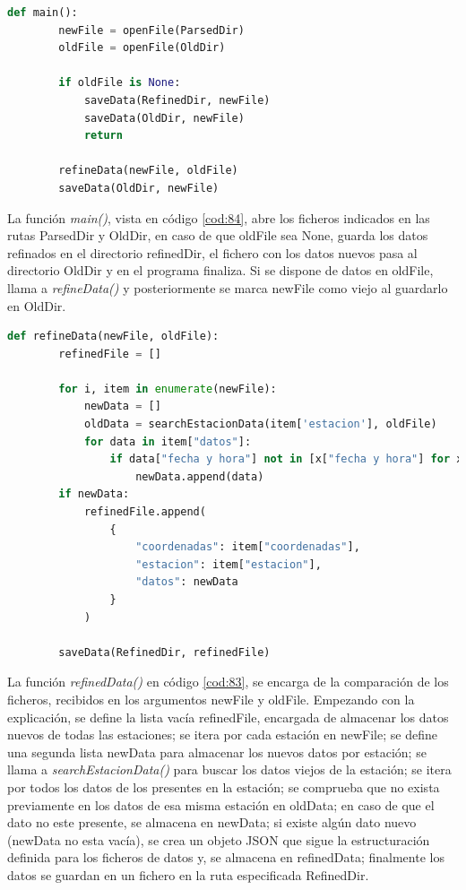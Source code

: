 \begin{lstlisting}[language=Python, caption={Declaración rutas JSONs}, label=cod:84]
	def main():
		newFile = openFile(ParsedDir)
		oldFile = openFile(OldDir)
		
		if oldFile is None:
			saveData(RefinedDir, newFile)
			saveData(OldDir, newFile)
			return
		
		refineData(newFile, oldFile)
		saveData(OldDir, newFile)
\end{lstlisting}

La función \textit{main()}, vista en código \ref{cod:84}, abre los ficheros indicados en las rutas ParsedDir y OldDir, en caso de que oldFile sea None, guarda los datos refinados en el directorio refinedDir, el fichero con los datos nuevos pasa al directorio OldDir y en el programa finaliza. Si se dispone de datos en oldFile, llama a \textit{refineData()} y posteriormente se marca newFile como viejo al guardarlo en OldDir.

\begin{lstlisting}[language=Python, caption={Declaración función refinedData()}, label=cod:83]
	def refineData(newFile, oldFile):
		refinedFile = []
		
		for i, item in enumerate(newFile):
			newData = []
			oldData = searchEstacionData(item['estacion'], oldFile)
			for data in item["datos"]:
				if data["fecha y hora"] not in [x["fecha y hora"] for x in oldData]:
					newData.append(data)
		if newData:
			refinedFile.append(
				{
					"coordenadas": item["coordenadas"],
					"estacion": item["estacion"],
					"datos": newData
				}
			)
		
		saveData(RefinedDir, refinedFile)
\end{lstlisting}

La función \textit{refinedData()} en código \ref{cod:83}, se encarga de la comparación de los ficheros, recibidos en los argumentos newFile y oldFile. Empezando con la explicación, se define la lista vacía refinedFile, encargada de almacenar los datos nuevos de todas las estaciones; se itera por cada estación en newFile; se define una segunda lista newData para almacenar los nuevos datos por estación; se llama a \textit{searchEstacionData()} para buscar los datos viejos de la estación; se itera por todos los datos de los presentes en la estación; se comprueba que no exista previamente en los datos de esa misma estación en oldData; en caso de que el dato no este presente, se almacena en newData; si existe algún dato nuevo (newData no esta vacía), se crea un objeto JSON que sigue la estructuración definida para los ficheros de datos y, se almacena en refinedData; finalmente los datos se guardan en un fichero en la ruta especificada RefinedDir.

